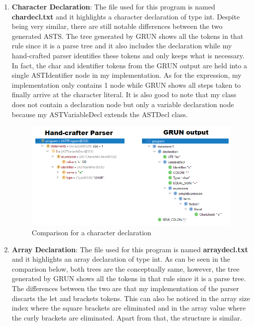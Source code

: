 \documentclass{article}
\begin{document}
		\begin{enumerate}
		\item \textbf{Character Declaration}: The file used for this program is named \textbf{chardecl.txt} and it highlights a character declaration of type int. Despite being very similar, there are still notable differences between the two generated ASTS. The tree generated by GRUN shows all the tokens in that rule since it is a parse tree and it also includes the declaration while my hand-crafted parser identifies these tokens and only keeps what is necessary. In fact, the char and identifier tokens from the GRUN output are held into a single ASTIdentifier node in my implementation. As for the expression, my implementation only contains 1 node while GRUN shows all steps taken to finally arrive at the character literal. It is also good to note that my class does not contain a declaration node but only a variable declaration node because my ASTVariableDecl extends the ASTDecl class.
		
						\begin{figure}[H]
					\centering
			 			\includegraphics[width=\textwidth]{comparechardecl.png}
			  			\caption{Comparison for a character declaration}
			  			\label{fig:comparechardecl}
					\end{figure}
					
		\item \textbf{Array Declaration}: The file used for this program is named \textbf{arraydecl.txt} and it highlights an array declaration of type int. As can be seen in the comparison below, both trees are the conceptually same, however, the tree generated by GRUN shows all the tokens in that rule since it is a parse tree. The differences between the two are that my implementation of the parser discarts the let and brackets tokens. This can also be noticed in the array size index where the square brackets are eliminated and in the array value where the curly brackets are eliminated. Apart from that, the structure is similar.
		

\end{enumerate}
\end{document}
